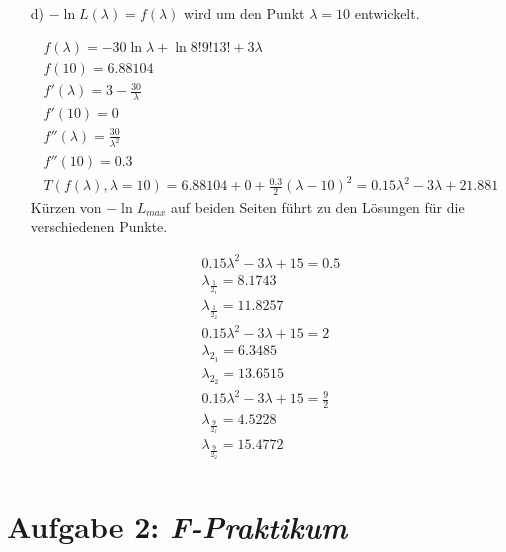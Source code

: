 \begin{itemize}
\item[d)]$-\ln{L(\lambda)} = f(\lambda)$ wird um den Punkt $\lambda  = 10 $ entwickelt.

\begin{align*}
f(\lambda) = -30\ln{\lambda}+\ln{8!9!13!}+3\lambda\\
f(10) = 6.88104\\
f'(\lambda) = 3-\frac{30}{\lambda}\\
f'(10) = 0\\
f''(\lambda) = \frac{30}{\lambda^2}\\
f''(10) = 0.3\\
T(f(\lambda),\lambda=10) = 6.88104 + 0 + \frac{0.3}{2}(\lambda-10)^2 = 0.15\lambda^2 - 3\lambda + 21.881
\end{align*}
Kürzen von $-\ln{L_{max}}$ auf beiden Seiten führt zu den Lösungen für die verschiedenen Punkte.

\begin{align*}
0.15 \lambda^2 -3\lambda + 15 = 0.5\\
\lambda_{\frac{1}{2_1}} = 8.1743\\
\lambda_{\frac{1}{2_2}} = 11.8257\\
0.15 \lambda^2 -3\lambda + 15 = 2\\
\lambda_{2_1 } = 6.3485\\
\lambda_{2_2 }= 13.6515\\ 
0.15 \lambda^2 -3\lambda + 15 = \frac{9}{2}\\
\lambda_{\frac{9}{2_1}} = 4.5228\\
\lambda_{\frac{9}{2_2}} = 15.4772\\
\end{align*}
\end{itemize}
\section*{Aufgabe 2: \emph{F-Praktikum}}

